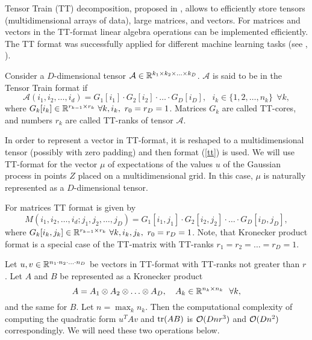   Tensor Train (TT) decomposition, proposed in \citet{oseledets2011}, allows to
  efficiently store tensors (multidimensional arrays of data), large matrices, and
  vectors. For matrices and vectors in the TT-format linear algebra operations
  can be implemented efficiently. The TT format was successfully applied for
  different machine learning tasks (see \citet{novikov2014}, \citet{novikov2015}).

  Consider a $D$-dimensional tensor $\mathcal A \in \mathbb{R}^{k_1 \times k_2 \times \ldots \times k_D}$.
  $\mathcal{A}$ is said to be in the Tensor Train format if
  \begin{equation}
  \label{tt}
    \mathcal{A}(i_1, i_2, \ldots, i_d) = G_1[i_1] \cdot G_2[i_2] \cdot \ldots \cdot G_D[i_D],~~~
    i_k \in \{1, 2, \ldots, n_k\}~~\forall k,
  \end{equation}
  where $G_k[i_k] \in \R^{r_{k-1}\times r_{k}}\ \forall k, i_k,\ r_0 = r_{D} = 1$. Matrices $G_k$ are called TT-cores, and numbers $r_k$ are called TT-ranks of
  tensor $\mathcal{A}$.

  In order to represent a vector in TT-format, it is reshaped to a multidimensional
  tensor (possibly with zero padding) and then format (\ref{tt}) is used. We will
  use TT-format for the vector $\mu$ of expectations of the values $u$ of the
  Gaussian process in points $Z$ placed on a multidimensional grid. In this case,
  $\mu$ is naturally represented as a $D$-dimensional tensor.

  For matrices TT format is given by
  \[
    M(i_1, i_2, \ldots, i_d; j_1, j_2, \ldots, j_D) = G_1 [i_1, j_1] \cdot
    G_2[i_2, j_2] \cdot \ldots \cdot G_D[i_D, j_D],
  \]
  where $G_k[i_k, j_k] \in \mathbb{R}^{r_{k-1}\times r_{k}}\ \forall k, i_k, j_k,\ r_0 = r_{D} = 1$.
  Note, that Kronecker product format is a special case of the TT-matrix with TT-ranks
  $r_1 = r_2 = \ldots = r_{D} = 1$.

  Let $u, v \in \mathbb{R}^{n_1 \cdot n_2 \cdot \ldots \cdot n_D}$ be vectors
  in TT-format with TT-ranks not greater than $r$. Let $A$ and $B$ be represented as a Kronecker product
  \[
    A = A_1 \otimes A_2 \otimes \ldots \otimes A_D,~~~A_k \in \mathbb{R}^{n_k \times n_k}~~\forall k,
  \]
  and the same for $B$. Let $n = \max_k n_k$. Then the computational complexity
  of computing the quadratic form $u^T A v$ and $\mbox{tr}(AB)$ is $\mathcal{O}(Dnr^3)$ and $\mathcal{O}(Dn^2)$ correspondingly. We will need these two
  operations below.
